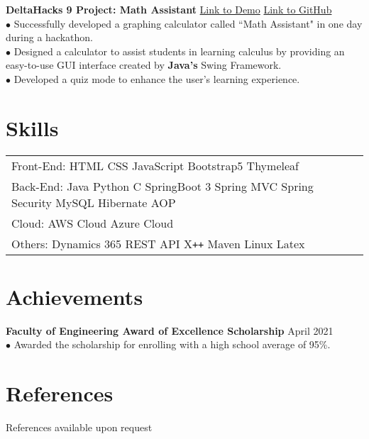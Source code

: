 \documentclass[letterpaper,12pt]{article}
\begin{document}
\textbf{DeltaHacks 9 Project: Math Assistant} \hfill \href{https://devpost.com/software/math-helper-graphing-calculator}{Link to Demo} \hspace{0.2cm} \href{https://github.com/Zicheng-Li/Math_helper}{Link to GitHub} \\
\hspace{0.1cm} $\bullet$ Successfully developed a graphing calculator called ``Math Assistant" in one day during a hackathon. \\
\hspace{0.1cm} $\bullet$ Designed a calculator to assist students in learning calculus by providing an easy-to-use GUI interface created by \textbf{Java's} Swing Framework.\\ 
\hspace{0.1cm} $\bullet$ Developed a quiz mode to enhance the user's learning experience.

\section{Skills}
\begin{tabularx}{\linewidth}{@{}l X@{}}
Front-End: \hspace{0.05cm} HTML \hspace{0.05cm} CSS \hspace{0.2cm} JavaScript \hspace{0.2cm} Bootstrap5 \hspace{0.2cm} Thymeleaf \\
Back-End: \hspace{0.05cm} Java \hspace{0.1cm} Python \hspace{0.1cm} C \hspace{0.1cm} SpringBoot 3 \hspace{0.05cm} Spring MVC \hspace{0.1cm} Spring Security \hspace{0.1cm} MySQL \hspace{0.1cm} Hibernate \hspace{0.1cm} AOP \\
Cloud:  \hspace{0.75cm} AWS Cloud \hspace{0.2cm} Azure Cloud \hspace{0.6cm}  \\
Others: \hspace{0.57cm} Dynamics 365 \hspace{0.1cm} REST API \hspace{0.15cm} X\texttt{++} \hspace{0.1cm} Maven \hspace{0.1cm} Linux \hspace{0.1cm} Latex \\
\end{tabularx}

\section{Achievements}
\textbf{Faculty of Engineering Award of Excellence Scholarship}  \hfill  \normalsize{April 2021} \\
$\bullet$ Awarded the scholarship for enrolling with a high school average of 95\%.
\section{References}
References available upon request
\end{document}
